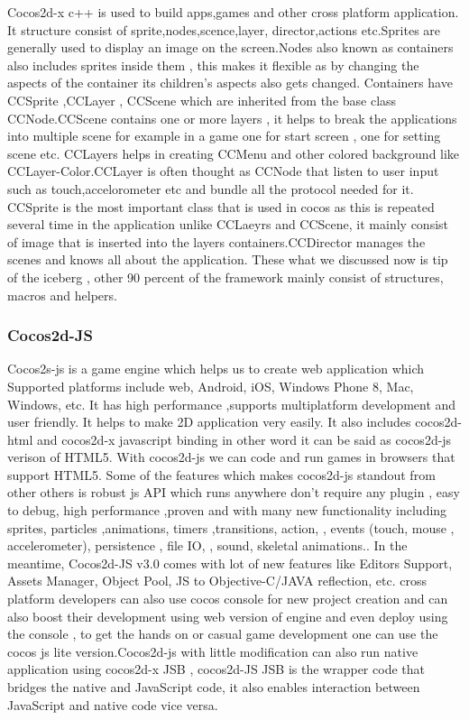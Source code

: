 \documentclass[23pt]{article}
\begin{document}
{\Large Cocos2d-x c++ is used to build apps,games and other cross platform application. It structure consist of sprite,nodes,scence,layer, director,actions etc.Sprites are generally used to display an image on the screen.Nodes also known as containers also includes sprites inside them , this makes it flexible as by changing the aspects of the container its children’s aspects also gets changed. Containers have CCSprite ,CCLayer , CCScene which are inherited from the base class CCNode.CCScene contains one or more layers , it helps to break the applications into multiple scene for example in a game one for start screen , one for setting scene etc. CCLayers helps in creating CCMenu and other colored background like CCLayer-Color.CCLayer is often thought as CCNode that listen to user input such as touch,accelorometer etc and bundle all the protocol needed for it. CCSprite is the most important class that is used in cocos as this is repeated several time in the application unlike CCLaeyrs and CCScene, it mainly consist of image that is inserted into the layers containers.CCDirector manages the scenes and knows all about the application. These what we discussed now is tip of the iceberg , other 90 percent of the framework mainly consist of structures, macros and helpers. \\ \par}


\subsubsection{Cocos2d-JS }

{\Large Cocos2s-js is a game engine which helps us to create web application which Supported platforms include web, Android, iOS, Windows Phone 8, Mac, Windows, etc.
It has high performance ,supports multiplatform development and user friendly. It helps to make 2D application very easily. It also includes  cocos2d-html and cocos2d-x javascript binding  in other word it can be said as cocos2d-js verison of HTML5. With cocos2d-js we can code and run games in browsers that support HTML5. Some of the features which makes cocos2d-js standout from other others is robust js API which runs anywhere don’t require any plugin , easy to debug, high performance ,proven and with many new functionality including sprites, particles ,animations, timers ,transitions, action, , events (touch, mouse , accelerometer), persistence , file IO, , sound, skeletal animations.. In the meantime, Cocos2d-JS v3.0 comes with lot of new features like Editors Support, Assets Manager, Object Pool, JS to Objective-C/JAVA reflection, etc. cross platform developers can also use cocos console for new project creation and can also boost their development using web version of engine and even deploy using the console , to get the hands on or casual game development one can use the cocos js lite version.Cocos2d-js with little modification can also run native application using cocos2d-x JSB , cocos2d-JS JSB is the wrapper code that bridges the native  and JavaScript code, it also enables interaction between JavaScript and native code vice versa. \\
\par}
\end{document}
